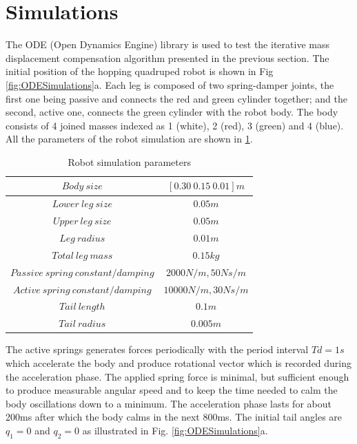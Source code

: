 \section{Simulations}\label{sec:simulation}

The ODE (Open Dynamics Engine) library \cite{ode:2008} is used to test the iterative mass displacement compensation algorithm presented in the previous section. The initial position of the hopping quadruped robot is shown in Fig \ref{fig:ODESimulations}a. Each leg is composed of two spring-damper joints, the first one being passive and connects the red and green cylinder together; and the second, active one, connects the green cylinder with the robot body. The body consists of 4 joined masses indexed as 1 (white), 2 (red), 3 (green) and 4 (blue). All the parameters of the  robot simulation are shown in \ref{tab:RobotDimensions}.

\begin{table}
\centering
\begin{tabular}{|c|c|}
	\hline
	$Body\: size$ &  $[0.30\: 0.15\: 0.01]m$ \\
	\hline
	$Lower\:leg\:size$ &  $0.05m$ \\
	\hline
	$Upper\:leg\:size$ &  $0.05m$ \\
	\hline
	$Leg\:radius$ &  $0.01m$ \\
	\hline
	$Total\:leg\:mass$ &  $0.15kg$ \\
	\hline
	$Passive\:spring\:constant/damping$ &  $2000N/m, 50Ns/m$ \\
	\hline
	$Active\:spring\:constant/damping$ &  $10000N/m, 30Ns/m$ \\
	\hline
	$Tail\:length$ &  $0.1m$ \\
	\hline
	$Tail\:radius$ &  $0.005m$ \\
	\hline
\end{tabular}
\caption{Robot simulation parameters}\label{tab:RobotDimensions}
\end{table}



The active springs generates forces periodically with the period interval $Td=1s$ which accelerate the body and produce rotational vector which is recorded during the acceleration phase. The applied spring force is minimal, but sufficient enough to produce measurable angular speed and to keep the time needed to calm the body oscillations down to a minimum. The acceleration phase lasts for about 200ms after which the body calms in the next 800ms. The initial tail angles are $q_1=0$ and $q_2=0$ as illustrated in Fig. \ref{fig:ODESimulations}a.

